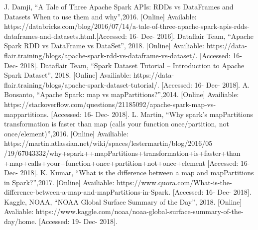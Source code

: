 \documentclass[conference]{IEEEtran}
\begin{document}
\begin{thebibliography}{00}
 J. Damji, ``A Tale of Three Apache Spark APIs: RDDs vs DataFrames and Datasets
When to use them and why'',2016. [Online] Available: https://databricks.com/blog/2016/07/14/a-tale-of-three-apache-spark-apis-rdds-dataframes-and-datasets.html.[Accessed: 16- Dec- 2016].
 Dataflair Team, ``Apache Spark RDD vs DataFrame vs DataSet'', 2018. [Online] Availiable: https://data-flair.training/blogs/apache-spark-rdd-vs-dataframe-vs-dataset/. [Accessed: 16- Dec- 2018].
 Dataflair Team, ``Spark Dataset Tutorial – Introduction to Apache Spark Dataset'', 2018. [Online] Availiable: https://data-flair.training/blogs/apache-spark-dataset-tutorial/. [Accessed: 16- Dec- 2018].
 A. Bonsanto, ``Apache Spark: map vs mapPartitions?'',2014. [Online] Availiable: https://stackoverflow.com/questions/21185092/apache-spark-map-vs-mappartitions. [Accessed: 16- Dec- 2018].
 L. Martin, ``Why spark's mapPartitions transformation is 
faster than map (calls your function once/partition, not once/element)'',2016. [Online] Availiable: https://martin.atlassian.net/wiki/spaces/lestermartin/blog/2016/05
/19/67043332/why+spark++mapPartitions+transformation+is+faster+than
+map+calls+your+function+once+partition+not+once+element [Accessed: 16- Dec- 2018].
 K. Kumar, ``What is the difference between a map and mapPartitions in Spark?'',2017. [Online] Availiable: https://www.quora.com/What-is-the-difference-between-a-map-and-mapPartitions-in-Spark. [Accessed: 16- Dec- 2018].
 Kaggle, NOAA, ``NOAA Global Surface Summary of the Day'', 2018. [Online] Avaliable: 
https://www.kaggle.com/noaa/noaa-global-surface-summary-of-the-day/home. [Accessed: 19- Dec- 2018].
\end{thebibliography}
\vspace{12pt}
\end{document}

